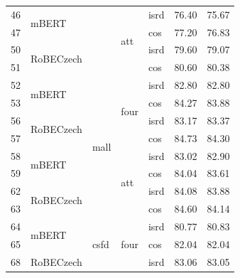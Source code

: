 \begin{table}[]
{\begin{tabular}{|l|l|l|l|l||ll|}
46 & \multirow{2}{*}{mBERT}     &  &  \multirow{4}{*}{att}  & isrd                  & 76.40   & 75.67 \\ \cline{1-1} \cline{5-7}
47 &                            &                           &    & cos                   & 77.20   & 76.83 \\ \cline{1-2} \cline{5-7}
50 & \multirow{2}{*}{RoBECzech} &                           &    & isrd                  & 79.60   & 79.07 \\ \cline{1-1} \cline{5-7}
51 &                            &                           &    & cos                   & 80.60   & 80.38 \\ \hline
52 & \multirow{2}{*}{mBERT}     & \multirow{8}{*}{mall}     &  \multirow{4}{*}{four}  & isrd                  & 82.80   & 82.80 \\ \cline{1-1} \cline{5-7}
53 &                            &                           &    & cos                   & 84.27   & 83.88 \\ \cline{1-2} \cline{5-7}
56 & \multirow{2}{*}{RoBECzech} &                           &    & isrd                  & 83.17   & 83.37 \\ \cline{1-1} \cline{5-7}
57 &                            &                           &    & cos                   & 84.73   & 84.30 \\ \cline{1-2} \cline{4-7}
58 & \multirow{2}{*}{mBERT}     &                           & \multirow{4}{*}{att}  & isrd                  & 83.02   & 82.90 \\ \cline{1-1} \cline{5-7}
59 &                            &                           &   & cos                   & 84.04   & 83.61 \\ \cline{1-2} \cline{5-7}
62 & \multirow{2}{*}{RoBECzech} &                           &   & isrd                  & 84.08   & 83.88 \\ \cline{1-1} \cline{5-7}
63 &                            &                           &   & cos                   & 84.60   & 84.14 \\ \hline
64 & \multirow{2}{*}{mBERT}     & \multirow{8}{*}{csfd}     &  \multirow{4}{*}{four}  & isrd                  & 80.77   & 80.83 \\ \cline{1-1} \cline{5-7}
65 &                            &                           &    & cos                   & 82.04   & 82.04 \\ \cline{1-2} \cline{5-7}
68 & \multirow{2}{*}{RoBECzech} &                           &    & isrd                  & 83.06   & 83.05 \\ \cline{1-1} \cline{5-7}

\end{tabular}}
\end{table}
